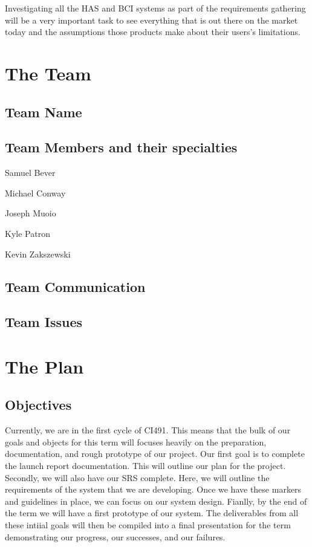 \documentclass{report}
\begin{document}
Investigating all the HAS and BCI systems as part of the requirements gathering will be a very important task to see everything that is out there on the market today and the assumptions those products make about their users's limitations.

\newpage
\section*{\centering The Team}

\subsection*{Team Name}


\subsection*{Team Members and their specialties}

Samuel Bever

Michael Conway

Joseph Muoio

Kyle Patron

Kevin Zakszewski



\subsection*{Team Communication}

\subsection*{Team Issues}

\newpage
\section*{\centering The Plan}

\subsection*{Objectives}
Currently, we are in the first cycle of CI491. This means that the bulk of our goals and objects for this term will focuses heavily on the preparation, documentation, and rough prototype of our project. Our first goal is to complete the launch report documentation. This will outline our plan for the project. Secondly, we will also have our SRS complete. Here, we will outline the requirements of the system that we are developing. Once we have these markers and guidelines in place, we can focus on our system design. Fianlly, by the end of the term we will have a first prototype of our system. The deliverables from all these intiial goals will then be compiled into a final presentation for the term demonstrating our progress, our successes, and our failures. 
\end{document}

